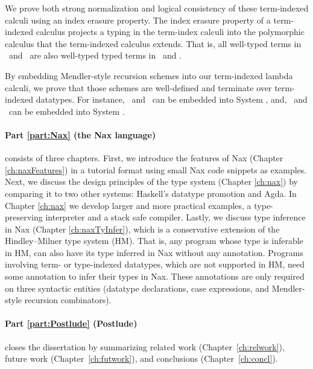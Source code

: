 We prove both strong normalization and logical consistency of
these term-indexed calculi using an index erasure property.
The index erasure property of a term-indexed calculus
projects a typing in the term-index calculi into
the polymorphic calculus that the term-indexed calculus extends.
That is, all well-typed terms in \Fi\ and \Fixi\ are
also well-typed typed terms in \Fw\ and \Fixw.

By embedding Mendler-style recursion schemes into our term-indexed
lambda calculi, we prove that those schemes are well-defined and
terminate over term-indexed datatypes.  For instance,
\MIt\ and \MsfIt\ can be embedded into System \Fi,
and, \MPr\ and \McvPr\ can be embedded into System \Fixi.

\paragraph{Part \ref{part:Nax} (the Nax language)}\hspace{-1em} consists of
three chapters.
First, we introduce the features of Nax (Chapter \ref{ch:naxFeatures})
in a tutorial format using small Nax code snippets as examples.
Next, we discuss the design principles of the type system (Chapter \ref{ch:nax})
by comparing it to two other systems: Haskell's datatype promotion and Agda.
In Chapter \ref{ch:nax} we develop
larger and more practical examples,
a type-preserving interpreter and a stack safe compiler.
Lastly, we discuss type inference in Nax (Chapter \ref{ch:naxTyInfer}),
which is a conservative extension of the Hindley--Milner type system (HM).
That is, any program whose type is inferable in HM, can also have its type
inferred in Nax without any annotation. Programs involving
term- or type-indexed datatypes, which are not supported in HM, need
some annotation to infer their types in Nax. These annotations are only
required on three syntactic entities (datatype declarations, case expressions,
and Mendler-style recursion combinators).

\paragraph{Part \ref{part:Postlude} (Postlude)}\hspace{-1em} closes
the dissertation by summarizing
  related work (Chapter~\ref{ch:relwork}),
  future work (Chapter~\ref{ch:futwork}), and
  conclusions (Chapter~\ref{ch:concl}).

